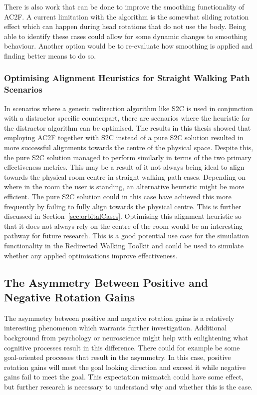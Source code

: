 There is also work that can be done to improve the smoothing functionality of AC2F. A current limitation with the algorithm is the somewhat sliding rotation effect which can happen during head rotations that do not use the body. Being able to identify these cases could allow for some dynamic changes to smoothing behaviour. Another option would be to re-evaluate how smoothing is applied and finding better means to do so. 

\subsubsection{Optimising Alignment Heuristics for Straight Walking Path Scenarios}
In scenarios where a generic redirection algorithm like S2C is used in conjunction with a distractor specific counterpart, there are scenarios where the heuristic for the distractor algorithm can be optimised. The results in this thesis showed that employing AC2F together with S2C instead of a pure S2C solution resulted in more successful alignments towards the centre of the physical space. Despite this, the pure S2C solution managed to perform similarly in terms of the two primary effectiveness metrics. This may be a result of it not always being ideal to align towards the physical room centre in straight walking path cases. Depending on where in the room the user is standing, an alternative heuristic might be more efficient. The pure S2C solution could in this case have achieved this more frequently by failing to fully align towards the physical centre. This is further discussed in Section~\ref{sec:orbitalCases}. Optimising this alignment heuristic so that it does not always rely on the centre of the room would be an interesting pathway for future research. This is a good potential use case for the simulation functionality in the Redirected Walking Toolkit and could be used to simulate whether any applied optimisations improve effectiveness. 

\subsection{The Asymmetry Between Positive and Negative Rotation Gains}
The asymmetry between positive and negative rotation gains is a relatively interesting phenomenon which warrants further investigation. Additional background from psychology or neuroscience might help with enlightening what cognitive processes result in this difference. There could for example be some goal-oriented processes that result in the asymmetry. In this case, positive rotation gains will meet the goal looking direction and exceed it while negative gains fail to meet the goal. This expectation mismatch could have some effect, but further research is necessary to understand why and whether this is the case. 
      
